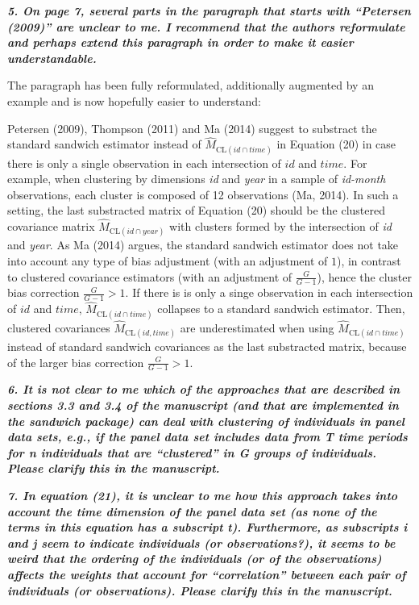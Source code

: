 \documentclass[10pt,a4paper]{article}
\begin{document}
\textbf{\textit{5. On page 7, several parts in the paragraph that starts with ``Petersen (2009)'' are unclear
to me. I recommend that the authors reformulate and perhaps extend this paragraph in
order to make it easier understandable.}}

\medskip

The paragraph has been fully reformulated, additionally augmented by an example and is now hopefully easier to understand:

Petersen (2009), Thompson (2011) and Ma (2014)
suggest to substract the standard sandwich estimator instead of $\hat M_{\mathrm{CL}(id \cap time)}$ in Equation (20) in case there is only a single
observation in each intersection of $id$ and $time$.
For example, when clustering by dimensions \emph{id} and \emph{year} in a sample
of \emph{id-month} observations, each cluster is composed of 12 observations (Ma, 2014). In such a setting, the last substracted matrix of Equation (20) should be the clustered covariance matrix  $\hat M_{\mathrm{CL}(id \cap year)}$
with clusters formed by the intersection of \emph{id} and \emph{year}.
As Ma (2014) argues, the standard sandwich estimator does not take into
account any type of bias adjustment (with an adjustment of $1$), in contrast to clustered covariance estimators (with an adjustment of $\frac{G}{G-1}$), hence the cluster bias correction  $\frac{G}{G-1} > 1$. If there is is only a singe observation in each intersection of $id$ and $time$, $\hat M_{\mathrm{CL}(id \cap time)}$ collapses to a standard sandwich estimator. Then, clustered covariances $\hat M_{\mathrm{CL}(id,time)}$ are underestimated when using $\hat M_{\mathrm{CL}(id \cap time)}$ instead of standard sandwich covariances as the last substracted matrix, because of the larger bias correction $\frac{G}{G-1} > 1$.

\medskip

\textbf{\textit{6. It is not clear to me which of the approaches that are described in sections 3.3 and 3.4
of the manuscript (and that are implemented in the sandwich package) can deal with clustering of individuals in panel data sets, e.g., if the panel data set includes data from T time periods for n individuals that are ``clustered'' in G groups of individuals. Please clarify this in the manuscript.}}

\medskip

\textbf{\textit{7. In equation (21), it is unclear to me how this approach takes into account the time
dimension of the panel data set (as none of the terms in this equation has a subscript t).
Furthermore, as subscripts i and j seem to indicate individuals (or observations?), it
seems to be weird that the ordering of the individuals (or of the observations) affects the
weights that account for ``correlation'' between each pair of individuals (or observations).
Please clarify this in the manuscript.}}
\end{document}
